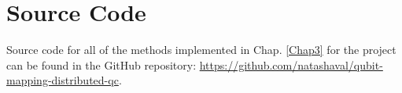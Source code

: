 \chapter{Source Code} \label{source-code}
Source code for all of the methods implemented in Chap. \ref{Chap3} for the project can be found in the GitHub repository: \newline \url{https://github.com/natashaval/qubit-mapping-distributed-qc}. \newline \\




